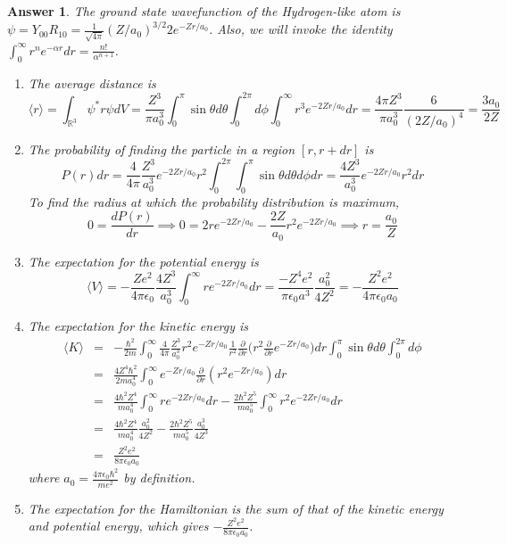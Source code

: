 \documentclass[a4paper]{article}
\newtheorem{ans}{Answer}[section]
\theoremstyle{new}
\begin{document}
\begin{ans}
The ground state wavefunction of the Hydrogen-like atom is $\psi=Y_{00}R_{10}=\frac{1}{\sqrt{4\pi}}(Z/a_0)^{3/2}2e^{-Zr/a_0}$. Also, we will invoke the identity $\int_0^\infty r^ne^{-\alpha r}dr=\frac{n!}{\alpha^{n+1}}$.
\begin{enumerate}[label=(\alph*)]
\item The average distance is
$$\langle r\rangle=\int_{\mathbb{R}^3}\psi^*r\psi dV=\frac{Z^3}{\pi a_0^3}\int_0^\pi\sin\theta d\theta\int_0^{2\pi}d\phi\int_0^\infty r^3e^{-2Zr/a_0}dr=\frac{4\pi Z^3}{\pi a_0^3}\frac{6}{(2Z/a_0)^4}=\frac{3a_0}{2Z}$$
\item The probability of finding the particle in a region $[r,r+dr]$ is
$$P(r)dr=\frac{4}{4\pi}\frac{Z^3}{a_0^3}e^{-2Zr/a_0}r^2\int_0^{2\pi}\int_0^\pi\sin\theta d\theta d\phi dr=\frac{4Z^3}{a_0^3}e^{-2Zr/a_0}r^2dr$$
To find the radius at which the probability distribution is maximum,
$$0=\frac{dP(r)}{dr}\implies 0=2re^{-2Zr/a_0}-\frac{2Z}{a_0}r^2e^{-2Zr/a_0}\implies r=\frac{a_0}{Z}$$
\item The expectation for the potential energy is
$$\langle V\rangle=-\frac{Ze^2}{4\pi\epsilon_0}\frac{4Z^3}{a_0^3}\int_0^\infty re^{-2Zr/a_0}dr=\frac{-Z^4e^2}{\pi\epsilon_0a^3}\frac{a_0^2}{4Z^2}=-\frac{Z^2e^2}{4\pi\epsilon_0a_0}$$
\item The expectation for the kinetic energy is
\begin{eqnarray}
\langle K\rangle&=&-\frac{\hbar^2}{2m}\int_0^\infty\frac{4}{4\pi}\frac{Z^3}{a_0^3}r^2e^{-Zr/a_0}\frac{1}{r^2}\frac{\partial}{\partial r}\bigg(r^2\frac{\partial}{\partial r}e^{-Zr/a_0}\bigg)dr\int_0^\pi\sin\theta d\theta\int_0^{2\pi}d\phi\nonumber\\&=&\frac{4Z^4\hbar^2}{2ma_0^4}\int_0^\infty e^{-Zr/a_0}\frac{\partial}{\partial r}(r^2e^{-Zr/a_0})dr\nonumber\\&=&\frac{4\hbar^2Z^4}{ma_0^4}\int_0^\infty re^{-2Zr/a_0}dr-\frac{2\hbar^2Z^5}{ma_0^5}\int_0^\infty r^2e^{-2Zr/a_0}dr\nonumber\\&=&\frac{4\hbar^2Z^4}{ma_0^4}\frac{a_0^2}{4Z^2}-\frac{2\hbar^2Z^5}{ma_0^5}\frac{a_0^3}{4Z^3}\nonumber\\&=&\frac{Z^2e^2}{8\pi\epsilon_0a_0}\nonumber
\end{eqnarray}
where $a_0=\frac{4\pi\epsilon_0\hbar^2}{me^2}$ by definition.
\item The expectation for the Hamiltonian is the sum of that of the kinetic energy and potential energy, which gives $-\frac{Z^2e^2}{8\pi\epsilon_0a_0}$.
\end{enumerate}
\end{ans}
\end{document}

